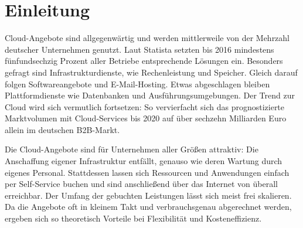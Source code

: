 \chapter{Einleitung}


Cloud-Angebote sind allgegenwärtig und werden mittlerweile von der Mehrzahl deutscher Unternehmen genutzt. Laut Statista setzten bis 2016 mindestens fünfundsechzig Prozent aller Betriebe entsprechende Lösungen ein. 
Besonders gefragt sind Infrastrukturdienste, wie Rechenleistung und Speicher. Gleich darauf folgen Softwareangebote und E-Mail-Hosting. Etwas abgeschlagen bleiben Plattformdienste wie Datenbanken und Ausführungsumgebungen. %
Der Trend zur Cloud wird sich vermutlich fortsetzen: So vervierfacht sich das prognostizierte Marktvolumen mit Cloud-Services bis 2020 auf über sechzehn Milliarden Euro allein im deutschen B2B-Markt. %

Die Cloud-Angebote sind für Unternehmen aller Größen attraktiv: Die Anschaffung eigener Infrastruktur entfällt, genauso wie deren Wartung durch eigenes Personal. Stattdessen lassen sich Ressourcen und Anwendungen einfach per Self-Service buchen und sind anschließend über das Internet von überall erreichbar. Der Umfang der gebuchten Leistungen lässt sich meist frei skalieren. Da die Angebote oft in kleinem Takt und verbrauchsgenau abgerechnet werden, ergeben sich so theoretisch Vorteile bei Flexibilität und Kosteneffizienz.

